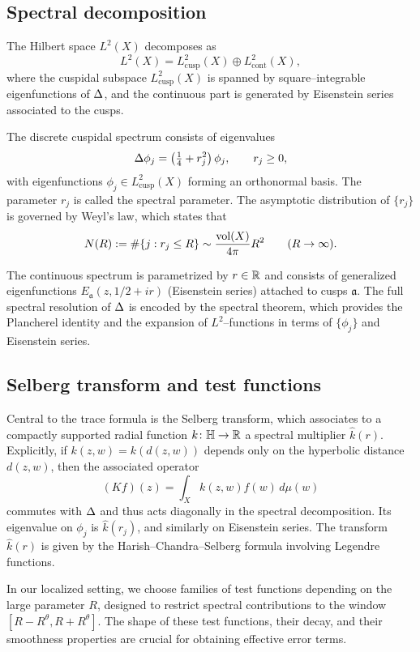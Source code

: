 \subsection{Spectral decomposition}\label{subsec:spectral}

The Hilbert space $L^2(X)$ decomposes as
\[
L^2(X) = L^2_{\mathrm{cusp}}(X) \oplus L^2_{\mathrm{cont}}(X),
\]
where the cuspidal subspace $L^2_{\mathrm{cusp}}(X)$ is spanned by square–integrable eigenfunctions of $\Delta$, and the continuous part is generated by Eisenstein series associated to the cusps.

The discrete cuspidal spectrum consists of eigenvalues
\[
\Delta \phi_j = \left( \tfrac14 + r_j^2 \right) \phi_j, \qquad r_j \ge 0,
\]
with eigenfunctions $\phi_j \in L^2_{\mathrm{cusp}}(X)$ forming an orthonormal basis. The parameter $r_j$ is called the spectral parameter. The asymptotic distribution of $\{r_j\}$ is governed by Weyl’s law, which states that
\[
N(R) := \#\{ j : r_j \leq R\} \sim \frac{\operatorname{vol}(X)}{4\pi} R^2 \qquad (R\to\infty).
\]

The continuous spectrum is parametrized by $r \in \mathbb{R}$ and consists of generalized eigenfunctions $E_\mathfrak{a}(z,1/2+ir)$ (Eisenstein series) attached to cusps $\mathfrak{a}$. The full spectral resolution of $\Delta$ is encoded by the spectral theorem, which provides the Plancherel identity and the expansion of $L^2$–functions in terms of $\{\phi_j\}$ and Eisenstein series.

\subsection{Selberg transform and test functions}\label{subsec:selberg}

Central to the trace formula is the Selberg transform, which associates to a compactly supported radial function $k \colon \mathbb{H} \to \mathbb{R}$ a spectral multiplier $\widehat{k}(r)$. Explicitly, if $k(z,w) = k(d(z,w))$ depends only on the hyperbolic distance $d(z,w)$, then the associated operator
\[
(Kf)(z) = \int_X k(z,w) f(w)\, d\mu(w)
\]
commutes with $\Delta$ and thus acts diagonally in the spectral decomposition. Its eigenvalue on $\phi_j$ is $\widehat{k}(r_j)$, and similarly on Eisenstein series. The transform $\widehat{k}(r)$ is given by the Harish–Chandra–Selberg formula involving Legendre functions.

In our localized setting, we choose families of test functions depending on the large parameter $R$, designed to restrict spectral contributions to the window $[R-R^\theta, R+R^\theta]$. The shape of these test functions, their decay, and their smoothness properties are crucial for obtaining effective error terms.

